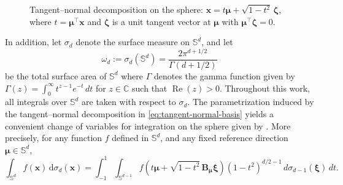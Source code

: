 \documentclass[12pt]{report} %
\newcommand{\bx}{\mathbf{x}}
\newcommand{\bzeta}{\boldsymbol{\zeta}}
\newcommand{\bmu}{\boldsymbol{\mu}}
\newcommand{\bxi}{\boldsymbol{\xi}}
\newcommand{\sigmad}{\sigma_{d}}
\newcommand{\sigmadm}{\sigma_{d-1}}
\newcommand{\rd}{\mathrm{d}}
\newcommand{\Sd}{\mathbb{S}^{d}}
\newcommand{\Sdm}{\mathbb{S}^{d-1}}
\newcommand{\bB}{\mathbf{B}}
\begin{document}
\begin{figure}[!ht]
\caption{Tangent--normal decomposition on the sphere: $\bx=t\bmu+\sqrt{1-t^2}\,\bzeta$, where $t=\bmu^\top\bx$ and $\bzeta$ is a unit tangent vector at $\bmu$ with $\bmu^\top\bzeta=0$.}
\label{fig:tangent-normal}
\end{figure}


In addition, let $\sigmad$ denote the surface measure on $\Sd$, and let
\begin{equation}
\label{eq:omega-d}
\omega_d := \sigmad(\mathbb{S}^d)
= \frac{2\pi^{d+1/2}}{\Gamma\!\left({d+1}/{2}\right)}
\end{equation}
be the total surface area of $\Sd$ where $\Gamma$ denotes the gamma function given by $\Gamma(z) = \int_{0}^{\infty} t^{z-1}e^{-t} \,dt$ for $z\in \mathbb{C}$ such that $\operatorname{Re}(z) > 0$. Throughout this work, all integrals over $\Sd$ are taken with respect to $\sigmad$. The parametrization induced by the tangent--normal decomposition in \eqref{eq:tangent-normal-basis} yields a convenient change of variables for integration on the sphere given by \citet[Lemma~B.4]{Garcia-Portugues2014}. More precisely, for any function $f$ defined in $\Sd$, and any fixed reference direction $\bmu\in\mathbb{S}^d$,
\begin{equation*}
\label{eq:change-variable-sphere}
\int_{\mathbb{S}^d} f(\bx)\,\rd\sigmad(\bx)
=
\int_{-1}^{1}\int_{\Sdm}
f\!\left(t\bmu+\sqrt{1-t^2}\,\bB_{\bmu}\bxi\right)
(1-t^2)^{d/2-1}\,
d\sigmadm(\bxi)\,dt.
\end{equation*}
\end{document}
